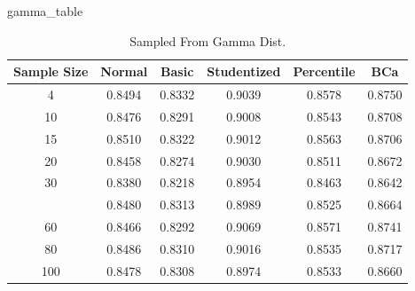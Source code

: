 \documentclass[12pt]{article}
\newenvironment{Shaded}{\begin{snugshade}}{\end{snugshade}}
\newcommand{\NormalTok}[1]{#1}
\begin{document}
\begin{Shaded}
\begin{Highlighting}[]
\NormalTok{gamma\_table}
\end{Highlighting}
\end{Shaded}

\begin{table}

\caption{\label{tab:create graphs}Sampled From Gamma Dist.}
\centering
\begin{tabular}[t]{cccccc}
\toprule
Sample Size & Normal & Basic & Studentized & Percentile & BCa\\
\midrule
4 & 0.8494 & 0.8332 & 0.9039 & 0.8578 & 0.8750\\
10 & 0.8476 & 0.8291 & 0.9008 & 0.8543 & 0.8708\\
15 & 0.8510 & 0.8322 & 0.9012 & 0.8563 & 0.8706\\
20 & 0.8458 & 0.8274 & 0.9030 & 0.8511 & 0.8672\\
30 & 0.8380 & 0.8218 & 0.8954 & 0.8463 & 0.8642\\
\addlinespace
40 & 0.8480 & 0.8313 & 0.8989 & 0.8525 & 0.8664\\
60 & 0.8466 & 0.8292 & 0.9069 & 0.8571 & 0.8741\\
80 & 0.8486 & 0.8310 & 0.9016 & 0.8535 & 0.8717\\
100 & 0.8478 & 0.8308 & 0.8974 & 0.8533 & 0.8660\\
\bottomrule
\end{tabular}
\end{table}
\end{document}
